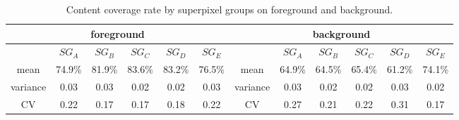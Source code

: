 \documentclass[runningheads,a4paper]{llncs}
\begin{document}

\begin{table}[!h]
\centering
\vspace{-0.2cm}
\caption{Content coverage rate by superpixel groups on foreground and background.}
\begin{tabular}{c|c|c|c|c|c||c|c|c|c|c|c}
\hline
\multicolumn{6}{c||}{foreground} &\multicolumn{6}{c}{background}\\
\hline
& $SG_{A}$ & $SG_{B}$ & $SG_{C}$ & $SG_{D}$ & $SG_{E}$ && $SG_{A}$ & $SG_{B}$ & $SG_{C}$ & $SG_{D}$ & $SG_{E}$ \\
\hline
mean & 74.9\% & 81.9\% & 83.6\%& 83.2\%& 76.5\% & mean & 64.9\% & 64.5\% & 65.4\%& 61.2\%& 74.1\% \\
\hline
variance & 0.03 & 0.03& 0.02& 0.02& 0.03 & variance & 0.03 & 0.02 & 0.02& 0.03& 0.02 \\
\hline
CV & 0.22 & 0.17 & 0.17& 0.18& 0.22 & CV & 0.27 & 0.21& 0.22& 0.31& 0.17 \\
\hline
\end{tabular}
\label{tab:sg-coverage}
\end{table}

%
\end{document}

